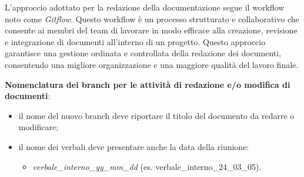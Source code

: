 	\label{nomenclatura}
L'approccio adottato per la redazione della documentazione segue il workflow noto come \textit{Gitflow}. Questo workflow è un processo strutturato e collaborativo che consente ai membri del team di lavorare in modo efficace alla creazione, revisione e integrazione di documenti all'interno di un progetto. Questo approccio garantisce una gestione ordinata e controllata della redazione dei documenti, consentendo una migliore organizzazione e una maggiore qualità del lavoro finale.
\begin{flushleft}
	\textbf{Nomenclatura dei branch per le attività di redazione e/o modifica di documenti}: \label{convenzioni_nomenclatura}
\end{flushleft}
\begin{itemize}
	\item il nome del nuovo branch deve riportare il titolo del documento da redarre o modificare;
	\item il nome dei verbali deve presentare anche la data della riunione:
	      \begin{itemize}
		      \item \textit{verbale\_interno\_yy\_mm\_dd} (es. verbale\_interno\_24\_03\_05).
	      \end{itemize}
\end{itemize}

